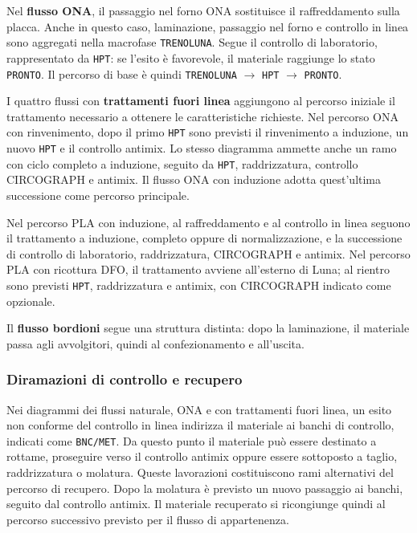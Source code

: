 Nel \textbf{flusso ONA}, il passaggio nel forno ONA sostituisce il raffreddamento sulla placca. Anche in questo caso, laminazione, passaggio nel forno e controllo in linea sono aggregati nella macrofase \texttt{TRENOLUNA}. Segue il controllo di laboratorio, rappresentato da \texttt{HPT}: se l'esito è favorevole, il materiale raggiunge lo stato \texttt{PRONTO}. Il percorso di base è quindi \texttt{TRENOLUNA} $\rightarrow$ \texttt{HPT} $\rightarrow$ \texttt{PRONTO}.

I quattro flussi con \textbf{trattamenti fuori linea} aggiungono al percorso iniziale il trattamento necessario a ottenere le caratteristiche richieste. Nel percorso ONA con rinvenimento, dopo il primo \texttt{HPT} sono previsti il rinvenimento a induzione, un nuovo \texttt{HPT} e il controllo antimix. Lo stesso diagramma ammette anche un ramo con ciclo completo a induzione, seguito da \texttt{HPT}, raddrizzatura, controllo CIRCOGRAPH e antimix. Il flusso ONA con induzione adotta quest'ultima successione come percorso principale.

Nel percorso PLA con induzione, al raffreddamento e al controllo in linea seguono il trattamento a induzione, completo oppure di normalizzazione, e la successione di controllo di laboratorio, raddrizzatura, CIRCOGRAPH e antimix. Nel percorso PLA con ricottura DFO, il trattamento avviene all'esterno di Luna; al rientro sono previsti \texttt{HPT}, raddrizzatura e antimix, con CIRCOGRAPH indicato come opzionale.

Il \textbf{flusso bordioni} segue una struttura distinta: dopo la laminazione, il materiale passa agli avvolgitori, quindi al confezionamento e all'uscita.

\subsubsection{Diramazioni di controllo e recupero}

Nei diagrammi dei flussi naturale, ONA e con trattamenti fuori linea, un esito non conforme del controllo in linea indirizza il materiale ai banchi di controllo, indicati come \texttt{BNC/MET}. Da questo punto il materiale può essere destinato a rottame, proseguire verso il controllo antimix oppure essere sottoposto a taglio, raddrizzatura o molatura. Queste lavorazioni costituiscono rami alternativi del percorso di recupero. Dopo la molatura è previsto un nuovo passaggio ai banchi, seguito dal controllo antimix. Il materiale recuperato si ricongiunge quindi al percorso successivo previsto per il flusso di appartenenza.

